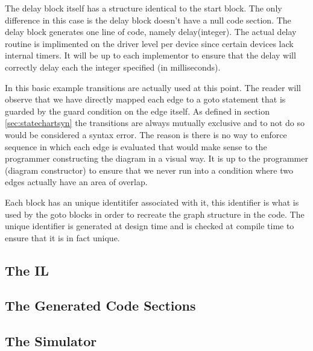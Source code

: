 The delay block itself has a structure identical to the start block. The only difference in this case is the delay block doesn't have a null code section. The delay block generates one line of code, namely delay(integer). The actual delay routine is implimented on the driver level per device since certain devices lack internal timers. It will be up to each implementor to ensure that the delay will correctly delay each the integer specified (in milliseconds). 

In this basic example transitions are actually used at this point. The reader will observe that we have directly mapped each edge to a goto statement that is guarded by the guard condition on the edge itself. As defined in section \ref{sec:statechartsyn} the transitions are always mutually exclusive and to not do so would be considered a syntax error. The reason is there is no way to enforce sequence in which each edge is evaluated that would make sense to the programmer constructing the diagram in a visual way. It is up to the programmer (diagram constructor) to ensure that we never run into a condition where two edges actually have an area of overlap.

Each block has an unique identitifer associated with it, this identifier is what is used by the goto blocks in order to recreate the graph structure in the code. The unique identifier is generated at design time and is checked at compile time to ensure that it is in fact unique.


\subsection{The IL}
\subsection{The Generated Code Sections}
\subsection{The Simulator}